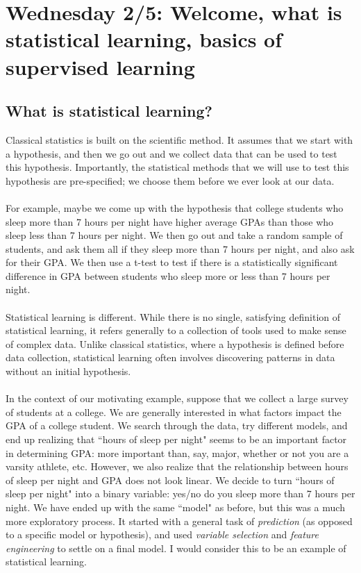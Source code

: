 \section{Wednesday 2/5: Welcome, what is statistical learning, basics of supervised learning}

\subsection{What is statistical learning?}
\label{sec_veryintro}

Classical statistics is built on the scientific method. It assumes that we start with a hypothesis, and then we go out and we collect data that can be used to test this hypothesis. Importantly, the statistical methods that we will use to test this hypothesis are pre-specified; we choose them before we ever look at our data. \\
\\
For example, maybe we come up with the hypothesis that college students who sleep more than 7 hours per night have higher average GPAs than those who sleep less than 7 hours per night. We then go out and take a random sample of students, and ask them all if they sleep more than 7 hours per night, and also ask for their GPA. We then use a t-test to test if there is a statistically significant difference in GPA between students who sleep more or less than 7 hours per night. \\
\\
Statistical learning is different. While there is no single, satisfying definition of statistical learning, it refers generally to a collection of tools used to make sense of complex data. Unlike classical statistics, where a hypothesis is defined before data collection, statistical learning often involves discovering patterns in data without an initial hypothesis. \\
\\
In the context of our motivating example, suppose that we collect a large survey of students at a college. We are generally interested in what factors impact the GPA of a college student. We search through the data, try different models, and end up realizing that ``hours of sleep per night" seems to be an important factor in determining GPA: more important than, say, major, whether or not you are a varsity athlete, etc. However, we also realize that the relationship between hours of sleep per night and GPA does not look linear. We decide to turn ``hours of sleep per night" into a binary variable: yes/no do you sleep more than 7 hours per night. We have ended up with the same ``model" as before, but this was a much more exploratory process. It started with a general task of \emph{prediction} (as opposed to a specific model or hypothesis), and used \emph{variable selection} and \emph{feature engineering} to settle on a final model. I would consider this to be an example of statistical learning. \\
